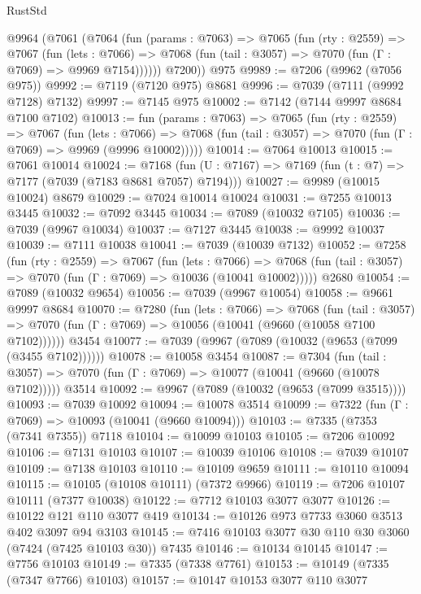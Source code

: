 \begin{lexlean}{RustStd}
\begin{coremodule}
{\begin{coremodule}
{{{{{{{{{{{{{{{{{{{{{{{{{{{{{{{{    @9964
      (@7061
        (@7064
          (fun (params : @7063) =>
          @7065
            (fun (rty : @2559) =>
            @7067
              (fun (lets : @7066) =>
              @7068 (fun (tail : @3057) => @7070 (fun (Γ : @7069) => @9969 @7154))))))
        @7200))
    @975
@9989 := @7206 (@9962 (@7056 @975))
@9992 := @7119 (@7120 @975) @8681
@9996 := @7039 (@7111 (@9992 @7128) @7132)
@9997 := @7145 @975
@10002 := @7142 (@7144 @9997 @8684 @7100 @7102)
@10013 := fun (params : @7063) =>
  @7065
    (fun (rty : @2559) =>
    @7067
      (fun (lets : @7066) =>
      @7068 (fun (tail : @3057) => @7070 (fun (Γ : @7069) => @9969 (@9996 @10002)))))
@10014 := @7064 @10013
@10015 := @7061 @10014
@10024 := @7168 (fun (U : @7167) => @7169 (fun (t : @7) => @7177 (@7039 (@7183 @8681 @7057) @7194)))
@10027 := @9989 (@10015 @10024) @8679
@10029 := @7024 @10014 @10024
@10031 := @7255 @10013 @3445
@10032 := @7092 @3445
@10034 := @7089 (@10032 @7105)
@10036 := @7039 (@9967 @10034)
@10037 := @7127 @3445
@10038 := @9992 @10037
@10039 := @7111 @10038
@10041 := @7039 (@10039 @7132)
@10052 := @7258
    (fun (rty : @2559) =>
    @7067
      (fun (lets : @7066) =>
      @7068 (fun (tail : @3057) => @7070 (fun (Γ : @7069) => @10036 (@10041 @10002)))))
    @2680
@10054 := @7089 (@10032 @9654)
@10056 := @7039 (@9967 @10054)
@10058 := @9661 @9997 @8684
@10070 := @7280
    (fun (lets : @7066) =>
    @7068
      (fun (tail : @3057) =>
      @7070 (fun (Γ : @7069) => @10056 (@10041 (@9660 (@10058 @7100 @7102))))))
    @3454
@10077 := @7039 (@9967 (@7089 (@10032 (@9653 (@7099 (@3455 @7102))))))
@10078 := @10058 @3454
@10087 := @7304
    (fun (tail : @3057) => @7070 (fun (Γ : @7069) => @10077 (@10041 (@9660 (@10078 @7102)))))
    @3514
@10092 := @9967 (@7089 (@10032 (@9653 (@7099 @3515))))
@10093 := @7039 @10092
@10094 := @10078 @3514
@10099 := @7322 (fun (Γ : @7069) => @10093 (@10041 (@9660 @10094)))
@10103 := @7335 (@7353 (@7341 @7355)) @7118
@10104 := @10099 @10103
@10105 := @7206 @10092
@10106 := @7131 @10103
@10107 := @10039 @10106
@10108 := @7039 @10107
@10109 := @7138 @10103
@10110 := @10109 @9659
@10111 := @10110 @10094
@10115 := @10105 (@10108 @10111) (@7372 @9966)
@10119 := @7206 @10107 @10111 (@7377 @10038)
@10122 := @7712 @10103 @3077 @3077
@10126 := @10122 @121 @110 @3077 @419
@10134 := @10126 @973 @7733 @3060 @3513 @402 @3097 @94 @3103
@10145 := @7416 @10103 @3077 @30 @110 @30 @3060 (@7424 (@7425 @10103 @30)) @7435
@10146 := @10134 @10145
@10147 := @7756 @10103
@10149 := @7335 (@7338 @7761)
@10153 := @10149 (@7335 (@7347 @7766) @10103)
@10157 := @10147 @10153 @3077 @110 @3077
}}}}}}}}}}}}}}}}}}}}}}}}}}}}}}}}
\end{coremodule}}
\end{coremodule}
\end{lexlean}
